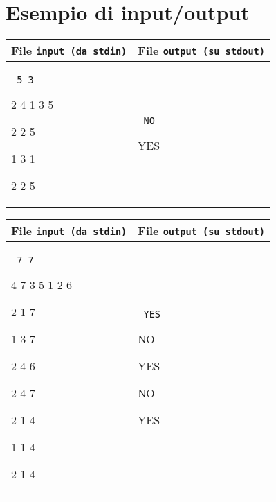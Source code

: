 \documentclass[a4paper,11pt]{article}
\newcommand{\file}[1]{\texttt{#1}}
\newcommand{\esempio}[2]{
  \noindent\begin{minipage}{\textwidth}
    \begin{tabular}{|p{11cm}|p{5cm}|}
      \hline
      \textbf{File \file{input (da stdin)}} & \textbf{File \file{output (su stdout)}}\\
      \hline
      \tt \small #1 &
      \tt \small #2 \\
      \hline
    \end{tabular}
  \end{minipage}
}
\begin{document}
\section*{Esempio di input/output}
\setlength{\tabcolsep}{6pt}
\esempio{
5 3

2 4 1 3 5

2 2 5

1 3 1

2 2 5
}{
NO

YES
}
  
\esempio{
7 7

4 7 3 5 1 2 6

2 1 7

1 3 7

2 4 6

2 4 7

2 1 4

1 1 4

2 1 4
}{
YES

NO

YES

NO

YES}
  
\end{document}
